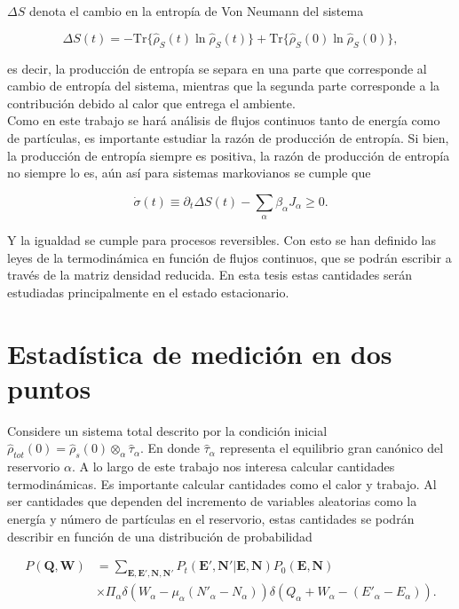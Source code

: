 $\Delta S$ denota el cambio en la entropía de Von Neumann del sistema

\begin{equation*}
    \Delta S(t) = -  \text{Tr}\{\hat{\rho}_{S}(t)\ln \hat{\rho}_{S}(t) \} +  \text{Tr}\{ \hat{\rho}_{S}(0)\ln \hat{\rho}_{S}(0) \},
\end{equation*}

es decir, la producción de entropía se separa en una parte que corresponde al cambio de entropía del sistema, mientras que la segunda parte corresponde a la contribución debido al calor que entrega el ambiente.\\
Como en este trabajo se hará análisis de flujos continuos tanto de energía como de partículas, es importante estudiar la razón de producción de entropía. Si bien, la producción de entropía siempre es positiva, la razón de producción de entropía no siempre lo es, aún así para sistemas markovianos se cumple que \cite{strasberg2019non}

\begin{equation*}
    \dot{\sigma}(t) \equiv \partial_{t}\Delta S(t) - \sum_{\alpha}\beta_{\alpha}J_{\alpha} \geq 0.
\end{equation*}

Y la igualdad se cumple para procesos reversibles. Con esto se han definido las leyes de la termodinámica en función de flujos continuos, que se podrán escribir a través de la matriz densidad reducida. En esta tesis estas cantidades serán estudiadas principalmente en el estado estacionario.

\label{sec3sub:leyestermo}

\section{Estadística de medición en dos puntos}
Considere un sistema total descrito por la condición inicial $\hat{\rho}_{tot}(0) = \hat{\rho}_{s}(0) \otimes_{\alpha} \hat{\tau}_{\alpha}$. En donde $\hat{\tau}_{\alpha}$ representa el equilibrio gran canónico del reservorio $\alpha$. A lo largo de este trabajo nos interesa calcular cantidades termodinámicas. Es importante calcular cantidades como el calor y trabajo. Al ser cantidades que dependen del incremento de variables aleatorias como la energía y número de partículas en el reservorio, estas cantidades se podrán describir en función de una distribución de probabilidad

\begin{align*}
    P(\textbf{Q},\textbf{W}) & = \sum_{\textbf{E},\textbf{E}',\textbf{N},\textbf{N}'} P_{t}(\textbf{E}',\textbf{N}'|\textbf{E},\textbf{N}) P_{0}(\textbf{E},\textbf{N})\\
                             & \times \Pi_{\alpha} \delta(W_{\alpha} - \mu_{\alpha}(N'_{\alpha} - N_{\alpha})) \delta(Q_{\alpha} + W_{\alpha}  - (E'_{\alpha} - E_{\alpha})).   
\end{align*}

